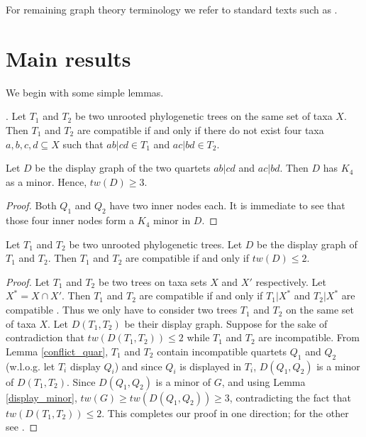  For remaining graph theory terminology we refer to standard texts such as \cite{diestel2000graph}.





\section{Main results}

We begin with some simple lemmas.

\begin{lemma}
\label{conflict_quar}
\textbf{\emph{\cite[Corollary 1]{Gan02}}}. Let $T_1$ and $T_2$ be two unrooted  phylogenetic trees on the same set of taxa $X$. Then $T_1$ and $T_2$ are compatible if and only if there do not exist four taxa ${a,b,c,d} \subseteq X$ such that $ab|cd \in T_1$ and $ac|bd \in T_2$. 
\end{lemma}

\begin{lemma} 
\label{display_minor}
Let $D$ be the display graph of the two quartets $ab|cd$ and $ac|bd$. Then $D$ has $K_4$ as a minor. Hence, $tw(D) \geq 3$.
\end{lemma}
\begin{proof}
 Both $Q_1$ and $Q_2$ have two inner nodes each. It is immediate to see that those four inner nodes form a $K_4$ minor in $D$.
\end{proof}


\begin{theorem}
 \label{thm:2trees}
 Let $T_1$ and $T_2$ be two unrooted phylogenetic trees. Let $D$ be the display graph of $T_1$ and $T_2$. Then $T_1$ and $T_2$ are compatible if and only if $tw(D)\leq 2$.
\end{theorem}

\begin{proof}
 Let $T_1$ and $T_2$ be two trees on taxa sets $X$ and $X'$ respectively. Let $X^* = X \cap X'$. Then $T_1$ and $T_2$ are compatible if and only if $T_1|X^*$ and $T_2|X^*$ are compatible \cite{SemSte03}. Thus we only have to consider two  trees $T_1$ and $T_2$ on the same set of taxa $X$. Let $D(T_1,T_2)$ be their display graph. Suppose for the sake of contradiction that $tw(D(T_1,T_2)) \leq 2$ while $T_1$ and $T_2$ are incompatible. From Lemma \ref{conflict_quar}, $T_1$ and $T_2$ contain incompatible quartets $Q_1$ and $Q_2$ (w.l.o.g. let $T_i$ display $Q_i$) and since $Q_i$ is displayed in $T_i$, $D(Q_1,Q_2)$ is a minor of $D(T_1,T_2)$. Since $D(Q_1,Q_2)$ is a minor of $G$, and using Lemma \ref{display_minor}, $tw(G)\geq tw(D(Q_1,Q_2))\geq 3$, contradicting the fact that $tw(D(T_1,T_2)) \leq 2$. This completes our proof in one direction; for the other see \cite{BryLag06}. 
\end{proof}



